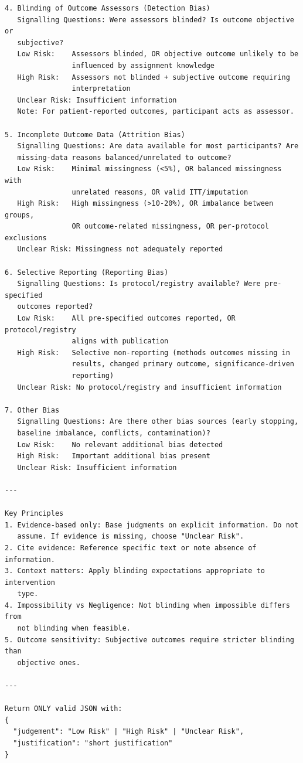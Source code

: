 \documentclass[../main.tex]{subfiles}
\begin{document}
\begin{verbatim}
4. Blinding of Outcome Assessors (Detection Bias)
   Signalling Questions: Were assessors blinded? Is outcome objective or
   subjective?
   Low Risk:    Assessors blinded, OR objective outcome unlikely to be
                influenced by assignment knowledge
   High Risk:   Assessors not blinded + subjective outcome requiring
                interpretation
   Unclear Risk: Insufficient information
   Note: For patient-reported outcomes, participant acts as assessor.

5. Incomplete Outcome Data (Attrition Bias)
   Signalling Questions: Are data available for most participants? Are
   missing-data reasons balanced/unrelated to outcome?
   Low Risk:    Minimal missingness (<5%), OR balanced missingness with
                unrelated reasons, OR valid ITT/imputation
   High Risk:   High missingness (>10-20%), OR imbalance between groups,
                OR outcome-related missingness, OR per-protocol exclusions
   Unclear Risk: Missingness not adequately reported

6. Selective Reporting (Reporting Bias)
   Signalling Questions: Is protocol/registry available? Were pre-specified
   outcomes reported?
   Low Risk:    All pre-specified outcomes reported, OR protocol/registry
                aligns with publication
   High Risk:   Selective non-reporting (methods outcomes missing in
                results, changed primary outcome, significance-driven
                reporting)
   Unclear Risk: No protocol/registry and insufficient information

7. Other Bias
   Signalling Questions: Are there other bias sources (early stopping,
   baseline imbalance, conflicts, contamination)?
   Low Risk:    No relevant additional bias detected
   High Risk:   Important additional bias present
   Unclear Risk: Insufficient information

---

Key Principles
1. Evidence-based only: Base judgments on explicit information. Do not
   assume. If evidence is missing, choose "Unclear Risk".
2. Cite evidence: Reference specific text or note absence of information.
3. Context matters: Apply blinding expectations appropriate to intervention
   type.
4. Impossibility vs Negligence: Not blinding when impossible differs from
   not blinding when feasible.
5. Outcome sensitivity: Subjective outcomes require stricter blinding than
   objective ones.

---

Return ONLY valid JSON with:
{
  "judgement": "Low Risk" | "High Risk" | "Unclear Risk",
  "justification": "short justification"
}
\end{verbatim}
\normalsize
\end{document}
